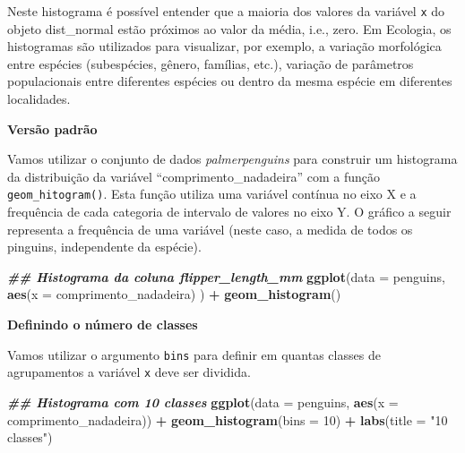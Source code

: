 \documentclass[
]{article}
\newenvironment{Shaded}{\begin{snugshade}}{\end{snugshade}}
\newcommand{\AttributeTok}[1]{\textcolor[rgb]{0.13,0.29,0.53}{#1}}
\newcommand{\DecValTok}[1]{\textcolor[rgb]{0.00,0.00,0.81}{#1}}
\newcommand{\DocumentationTok}[1]{\textcolor[rgb]{0.56,0.35,0.01}{\textbf{\textit{#1}}}}
\newcommand{\FunctionTok}[1]{\textcolor[rgb]{0.13,0.29,0.53}{\textbf{#1}}}
\newcommand{\NormalTok}[1]{#1}
\newcommand{\SpecialCharTok}[1]{\textcolor[rgb]{0.81,0.36,0.00}{\textbf{#1}}}
\newcommand{\StringTok}[1]{\textcolor[rgb]{0.31,0.60,0.02}{#1}}
\begin{document}
Neste histograma é possível entender que a maioria dos valores da variável \texttt{x} do objeto dist\_normal estão próximos ao valor da média, i.e., zero. Em Ecologia, os histogramas são utilizados para visualizar, por exemplo, a variação morfológica entre espécies (subespécies, gênero, famílias, etc.), variação de parâmetros populacionais entre diferentes espécies ou dentro da mesma espécie em diferentes localidades.

\textbf{Versão padrão}

Vamos utilizar o conjunto de dados \emph{palmerpenguins} para construir um histograma da distribuição da variável ``comprimento\_nadadeira'' com a função \texttt{geom\_hitogram()}. Esta função utiliza uma variável contínua no eixo X e a frequência de cada categoria de intervalo de valores no eixo Y. O gráfico a seguir representa a frequência de uma variável (neste caso, a medida de todos os pinguins, independente da espécie).

\begin{Shaded}
\begin{Highlighting}[]
\DocumentationTok{\#\# Histograma da coluna flipper\_length\_mm}
\FunctionTok{ggplot}\NormalTok{(}\AttributeTok{data =}\NormalTok{ penguins, }
       \FunctionTok{aes}\NormalTok{(}\AttributeTok{x =}\NormalTok{ comprimento\_nadadeira)}
\NormalTok{       ) }\SpecialCharTok{+}
    \FunctionTok{geom\_histogram}\NormalTok{()}
\end{Highlighting}
\end{Shaded}

\textbf{Definindo o número de classes}

Vamos utilizar o argumento \texttt{bins} para definir em quantas classes de agrupamentos a variável \texttt{x} deve ser dividida.

\begin{Shaded}
\begin{Highlighting}[]
\DocumentationTok{\#\# Histograma com 10 classes}
\FunctionTok{ggplot}\NormalTok{(}\AttributeTok{data =}\NormalTok{ penguins, }
       \FunctionTok{aes}\NormalTok{(}\AttributeTok{x =}\NormalTok{ comprimento\_nadadeira)) }\SpecialCharTok{+}
    \FunctionTok{geom\_histogram}\NormalTok{(}\AttributeTok{bins =} \DecValTok{10}\NormalTok{) }\SpecialCharTok{+}
    \FunctionTok{labs}\NormalTok{(}\AttributeTok{title =} \StringTok{"10 classes"}\NormalTok{)}
\end{Highlighting}
\end{Shaded}
\end{document}
